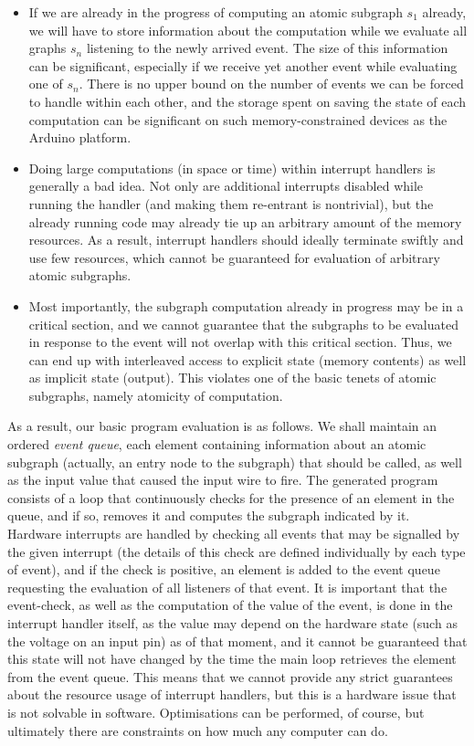 \documentclass[a4paper, oneside, final]{memoir}
\begin{document}
\begin{itemize}
\item If we are already in the progress of computing an atomic
  subgraph $s_1$ already, we will have to store information about the
  computation while we evaluate all graphs $s_n$ listening to the
  newly arrived event.  The size of this information can be
  significant, especially if we receive yet another event while
  evaluating one of $s_n$.  There is no upper bound on the number of
  events we can be forced to handle within each other, and the storage
  spent on saving the state of each computation can be significant on
  such memory-constrained devices as the Arduino platform.
\item Doing large computations (in space or time) within interrupt
  handlers is generally a bad idea.  Not only are additional
  interrupts disabled while running the handler (and making them
  re-entrant is nontrivial), but the already running code may already
  tie up an arbitrary amount of the memory resources.  As a result,
  interrupt handlers should ideally terminate swiftly and use few
  resources, which cannot be guaranteed for evaluation of arbitrary
  atomic subgraphs.
\item Most importantly, the subgraph computation already in progress
  may be in a critical section, and we cannot guarantee that the
  subgraphs to be evaluated in response to the event will not overlap
  with this critical section.  Thus, we can end up with interleaved
  access to explicit state (memory contents) as well as implicit state
  (output).  This violates one of the basic tenets of atomic
  subgraphs, namely atomicity of computation.
\end{itemize}

As a result, our basic program evaluation is as follows.  We shall
maintain an ordered \textit{event queue}, each element containing
information about an atomic subgraph (actually, an entry node to the
subgraph) that should be called, as well as the input value that
caused the input wire to fire.  The generated program consists of a
loop that continuously checks for the presence of an element in the
queue, and if so, removes it and computes the subgraph indicated by
it.  Hardware interrupts are handled by checking all events that may
be signalled by the given interrupt (the details of this check are
defined individually by each type of event), and if the check is
positive, an element is added to the event queue requesting the
evaluation of all listeners of that event.  It is important that the
event-check, as well as the computation of the value of the event, is
done in the interrupt handler itself, as the value may depend on the
hardware state (such as the voltage on an input pin) as of that
moment, and it cannot be guaranteed that this state will not have
changed by the time the main loop retrieves the element from the event
queue.  This means that we cannot provide any strict guarantees about
the resource usage of interrupt handlers, but this is a hardware issue
that is not solvable in software.  Optimisations can be performed, of
course, but ultimately there are constraints on how much any computer
can do.
\end{document}
